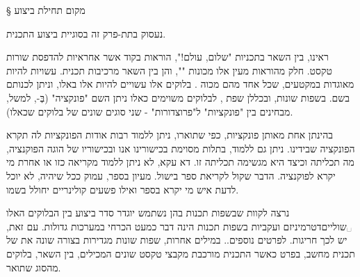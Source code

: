 § מקום תחילת ביצוע

נעסוק בתת-פרק זה בסוגיית 
ביצוע התכנית.

ראינו, בין השאר בתכניות "שלום, עולם!", הוראות בקוד אשר אחראיות להדפסת שורות
טקסט. חלק מהוראות מעין אלו מכונות "", והן בין השאר מרכיבות תכנית.
 עשויות להיות מאוגדות במקטעים, שכל אחד מהם מכוה . בלוקים אלו
עשויים להיות  אלו באלו, וניתן לכנותם בשם. בשפות שונות,
ובכללן שפת , לבלוקים משוימים כאלו ניתן השם "פונקציה" (בְּ-, למשל,
מבחינים בין "פונקציות" ל"פרוצדורות" - שני סוגים שונים של בלוקים שכאלו).

בהינתן אחת מאותן פונקציות, כפי שתוארו, ניתן ללמוד רבות אודות הפונקציות לה תקרא
הפונקציה שבידינו. ניתן גם ללמוד, בתלות מסוימת בכישורינו אנו ובכישוריו של הוגה
הפוקנציה, מה תכליתה וכיצד היא מגשימה תכליתה זו. דא עקא, לא ניתן ללמוד מקריאה
כזו או אחרת מי יקרא לפוקנציה. הדבר שקול לקריאת ספר בישול. מעיון בספר, עמוק ככל
שיהיה, לא יוכל לדעת איש מי יקרא בספר ואילו פשעים קולינריים יחולל בשמו.

נרצה לקוות שבשפות תכנות בהן נשתמש יוגדר סדר ביצוע בין הבלוקים האלו
␣שוליים{דטרמיניזם ועקביות בשפות תכנות הינה דבר כמעט הכרחי במערכות גדולות.
עם זאת, יש לכך חריגות. לפרטים נוספים.}. במילים אחרות, שפות שונות מגדירות בצורה
שונה את  של תכנית מחשב, בפרט כאשר התכנית מורכבת
מקבצי טקסט שונים המכילים, בין השאר, בלוקים מהסוג שתואר.

